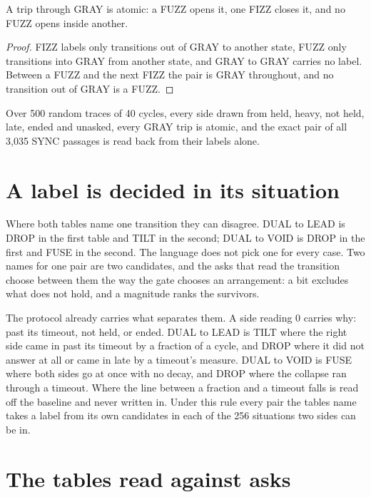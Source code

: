 \begin{proposition}
\label{prop:atomic}
A trip through GRAY is atomic: a FUZZ opens it, one FIZZ closes it, and no FUZZ opens inside
another.
\end{proposition}

\begin{proof}
FIZZ labels only transitions out of GRAY to another state, FUZZ only transitions into GRAY from
another state, and GRAY to GRAY carries no label. Between a FUZZ and the next FIZZ the pair is
GRAY throughout, and no transition out of GRAY is a FUZZ.
\end{proof}

Over 500 random traces of 40 cycles, every side drawn from held, heavy, not held, late, ended and
unasked, every GRAY trip is atomic, and the exact pair of all 3,035 SYNC passages is read back
from their labels alone.

\section{A label is decided in its situation}

Where both tables name one transition they can disagree. DUAL to LEAD is DROP in the first table
and TILT in the second; DUAL to VOID is DROP in the first and FUSE in the second. The language
does not pick one for every case. Two names for one pair are two candidates, and the asks that
read the transition choose between them the way the gate chooses an arrangement: a bit excludes
what does not hold, and a magnitude ranks the survivors.

The protocol already carries what separates them. A side reading 0 carries why: past its
timeout, not held, or ended. DUAL to LEAD is TILT where the right side came in past its timeout
by a fraction of a cycle, and DROP where it did not answer at all or came in late by a timeout's
measure. DUAL to VOID is FUSE where both sides go at once with no decay, and DROP where the
collapse ran through a timeout. Where the line between a fraction and a timeout falls is read off
the baseline and never written in. Under this rule every pair the tables name takes a label from
its own candidates in each of the 256 situations two sides can be in.

\section{The tables read against asks}


